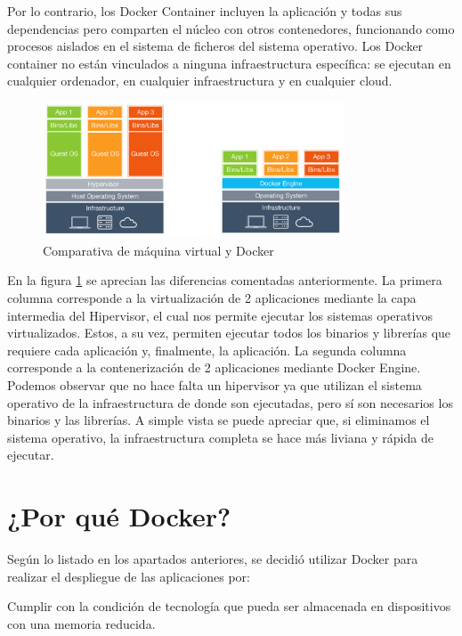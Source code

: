 Por lo contrario, los Docker Container incluyen la aplicación y todas sus dependencias pero comparten el núcleo con otros contenedores, funcionando como procesos aislados en el sistema de ficheros del sistema operativo. Los Docker container no están vinculados a ninguna infraestructura específica: se ejecutan en cualquier ordenador, en cualquier infraestructura y en cualquier cloud.

\begin{figure}[htb]
\begin{center}
\includegraphics[width=0.8\textwidth]{./setup/VrvsDocker}
\caption{Comparativa de máquina virtual y Docker}
\label{Vs:VrvsDocker}
\end{center}
\end{figure}

En la figura \ref{Vs:VrvsDocker} se aprecian las diferencias comentadas anteriormente. La primera columna corresponde a la virtualización de 2 aplicaciones mediante la capa
intermedia del Hipervisor, el cual nos permite ejecutar los sistemas operativos virtualizados. Estos, a su vez, permiten ejecutar todos los binarios y librerías que requiere cada aplicación y, finalmente, la aplicación. La segunda columna corresponde a la contenerización de 2 aplicaciones mediante Docker Engine. Podemos observar
que no hace falta un hipervisor ya que utilizan el sistema operativo de la infraestructura
de donde son ejecutadas, pero sí son necesarios los binarios y las librerías. A simple vista se puede apreciar que, si eliminamos el sistema operativo, la infraestructura completa se hace más liviana y rápida de ejecutar.

\section{¿Por qué Docker?}\label{PqD:PQDocker}

Según lo listado en los apartados anteriores, se decidió utilizar Docker para realizar el despliegue de las aplicaciones por:

Cumplir con la condición de tecnología que pueda ser almacenada en dispositivos con una memoria reducida.

